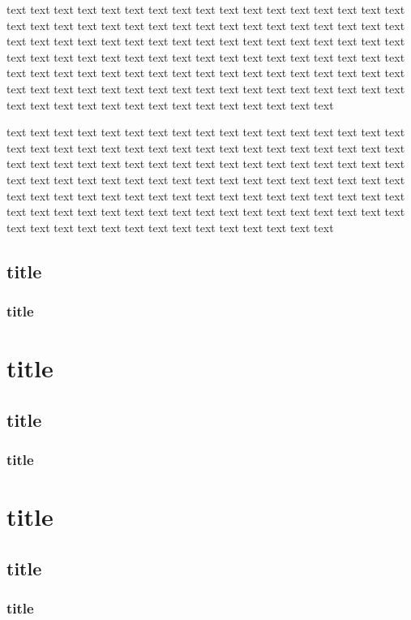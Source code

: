 \documentclass[12pt,a4paper,x11names,usenames,dvipsnames,svgnames,oneside]{book}
\begin{document}
\begin{sol}
	text text text text text text text text text text text text text text text text text text text text text text text text text text text text text text text text text text text text text text text text text text text text text text text text text text text text text text text text text text text text text text text text text text text text text text text text text text text text text text text text text text text text text text text text text text text text text text text text text text text text text text text text text text text text text text text text text text text text
\end{sol}
\begin{apll}
	text text text text text text text text text text text text text text text text text text text text text text text text text text text text text text text text text text text text text text text text text text text text text text text text text text text text text text text text text text text text text text text text text text text text text text text text text text text text text text text text text text text text text text text text text text text text text text text text text text text text text text text text text text text text text text text text text text text text
\end{apll}
\subsection{title}\subsubsection{title}
	\section{title}\subsection{title}\subsubsection{title}
	\section{title}\subsection{title}\subsubsection{title}
\end{document}
